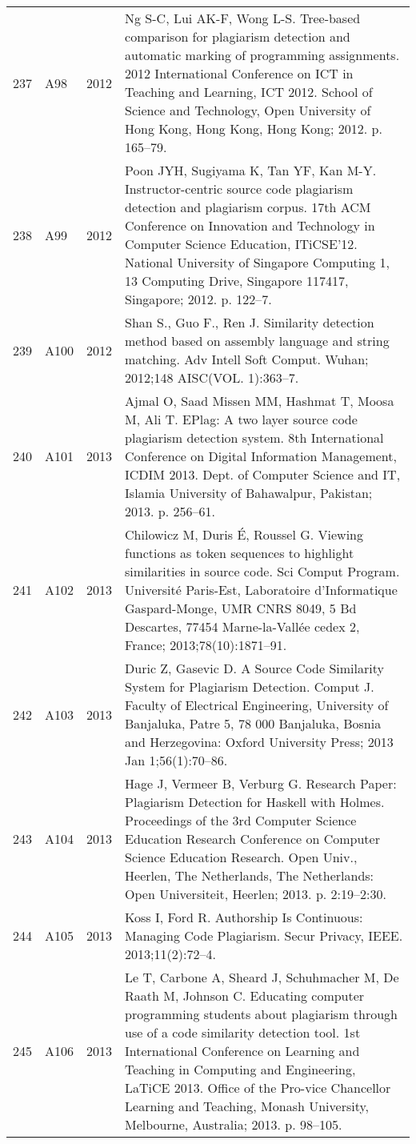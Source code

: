 \documentclass{article}\usepackage[]{graphicx}\usepackage[]{color}
\begin{document}
\begin{longtable}{l|L{1cm}|L{1cm}|L{12cm}|}
  237 & A98 & 2012 & Ng S-C, Lui AK-F, Wong L-S. Tree-based comparison for plagiarism detection and automatic marking of programming assignments. 2012 International Conference on ICT in Teaching and Learning, ICT 2012. School of Science and Technology, Open University of Hong Kong, Hong Kong, Hong Kong; 2012. p. 165–79. \\ 
  238 & A99 & 2012 & Poon JYH, Sugiyama K, Tan YF, Kan M-Y. Instructor-centric source code plagiarism detection and plagiarism corpus. 17th ACM Conference on Innovation and Technology in Computer Science Education, ITiCSE’12. National University of Singapore Computing 1, 13 Computing Drive, Singapore 117417, Singapore; 2012. p. 122–7. \\ 
  239 & A100 & 2012 & Shan S., Guo F., Ren J. Similarity detection method based on assembly language and string matching. Adv Intell Soft Comput. Wuhan; 2012;148 AISC(VOL. 1):363–7. \\ 
  240 & A101 & 2013 & Ajmal O, Saad Missen MM, Hashmat T, Moosa M, Ali T. EPlag: A two layer source code plagiarism detection system. 8th International Conference on Digital Information Management, ICDIM 2013. Dept. of Computer Science and IT, Islamia University of Bahawalpur, Pakistan; 2013. p. 256–61. \\ 
  241 & A102 & 2013 & Chilowicz M, Duris É, Roussel G. Viewing functions as token sequences to highlight similarities in source code. Sci Comput Program. Université Paris-Est, Laboratoire d’Informatique Gaspard-Monge, UMR CNRS 8049, 5 Bd Descartes, 77454 Marne-la-Vallée cedex 2, France; 2013;78(10):1871–91. \\ 
  242 & A103 & 2013 & Duric Z, Gasevic D. A Source Code Similarity System for Plagiarism Detection. Comput J. Faculty of Electrical Engineering, University of Banjaluka, Patre 5, 78 000 Banjaluka, Bosnia and Herzegovina: Oxford University Press; 2013 Jan 1;56(1):70–86. \\ 
  243 & A104 & 2013 & Hage J, Vermeer B, Verburg G. Research Paper: Plagiarism Detection for Haskell with Holmes. Proceedings of the 3rd Computer Science Education Research Conference on Computer Science Education Research. Open Univ., Heerlen, The Netherlands, The Netherlands: Open Universiteit, Heerlen; 2013. p. 2:19--2:30. \\ 
  244 & A105 & 2013 & Koss I, Ford R. Authorship Is Continuous: Managing Code Plagiarism. Secur Privacy, IEEE. 2013;11(2):72–4. \\ 
  245 & A106 & 2013 & Le T, Carbone A, Sheard J, Schuhmacher M, De Raath M, Johnson C. Educating computer programming students about plagiarism through use of a code similarity detection tool. 1st International Conference on Learning and Teaching in Computing and Engineering, LaTiCE 2013. Office of the Pro-vice Chancellor Learning and Teaching, Monash University, Melbourne, Australia; 2013. p. 98–105. \\ 

\end{longtable}
\end{document}
